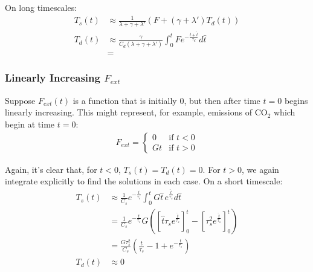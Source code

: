On long timescales:
\begin{align}
    T_s(t) & \approx \frac{1}{\lambda+\gamma+\lambda'}\left(F+(\gamma+\lambda ')T_d(t)\right) \\ 
    T_d(t) & \approx \frac{\gamma}{C_d(\lambda+\gamma+\lambda')}\int_0^t F e^{-\frac{t+\hat{t}}{\tau_d}}d\hat{t}\\
    &=
\end{align}

\subsubsection{Linearly Increasing \texorpdfstring{$F_{ext}$}{F-ext}}

Suppose $F_{ext}(t)$ is a function that is initially $0$, but then after time $t=0$ begins linearly increasing. This might represent, for example, emissions of CO$_2$ which begin at time $t=0$:
\begin{align*}
    F_{ext}=
    \begin{cases}
        0 & \text{if } t<0 \\
        Gt & \text{if } t>0
    \end{cases}
\end{align*}

Again, it's clear that, for $t<0$, $T_s(t)=T_d(t)=0$. For $t>0$, we again integrate explicitly to find the solutions in each case. On a short timescale:
\begin{align*}
    T_s(t) & \approx \frac{1}{C_s}e^{-\frac{t}{\tau_s}}\int_0^t G\hat{t}\, e^{\frac{\hat{t}}{\tau_s}}d\hat{t}\\
    &= \frac{1}{C_s}e^{-\frac{t}{\tau_s}} G \left( 
        \left[ \hat{t}\tau_s e^{\frac{\hat{t}}{\tau_s}} \right]_0^t - \left[ \tau_s^2 e^{\frac{\hat{t}}{\tau_s}} \right]_0^t
     \right)
    \\
    &=\frac{G\tau_s^2}{C_s}\left( \frac{t}{\tau_s} -1+e^{-\frac{t}{\tau_s}} \right)
    \\ 
    T_d(t)& \approx 0 
\end{align*}

